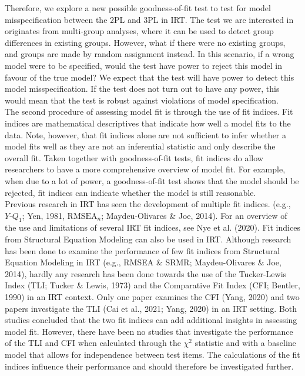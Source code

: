 \documentclass[Royal,sageapa,times,doublespace]{sagej}
\begin{document}
\indent Therefore, we explore a new possible goodness-of-fit test to test for model misspecification between the 2PL and 3PL in IRT. The test we are interested in originates from multi-group analyses, where it can be used to detect group differences in existing groups. However, what if there were no existing groups, and groups are made by random assignment instead. In this scenario, if a wrong model were to be specified, would the test have power to reject this model in favour of the true model? We expect that the test will have power to detect this model misspecification. If the test does not turn out to have any power, this would mean that the test is robust against violations of model specification. \\

\indent The second procedure of assessing model fit is through the use of fit indices. Fit indices are mathematical descriptives that indicate how well a model fits to the data. Note, however, that fit indices alone are not sufficient to infer whether a model fits well as they are not an inferential statistic and only describe the overall fit. Taken together with goodness-of-fit tests, fit indices do allow researchers to have a more comprehensive overview of model fit. For example, when due to a lot of power, a goodness-of-fit test shows that the model should be rejected, fit indices can indicate whether the model is still reasonable. \\ 
\indent Previous research in IRT has seen the development of multiple fit indices. (e.g., $Y\text{-}Q_1$; Yen, 1981, $\text{RMSEA}_n$; Maydeu-Olivares \& Joe, 2014). For an overview of the use and limitations of several IRT fit indices, see Nye et al. (2020). Fit indices from Structural Equation Modeling can also be used in IRT. Although research has been done to examine the performance of few fit indices from Structural Equation Modeling in IRT (e.g., RMSEA \& SRMR; Maydeu-Olivares \& Joe, 2014), hardly any research has been done towards the use of the Tucker-Lewis Index (TLI; Tucker \& Lewis, 1973) and the Comparative Fit Index (CFI; Bentler, 1990) in an IRT context. Only one paper examines the CFI (Yang, 2020) and two papers investigate the TLI (Cai et al., 2021; Yang, 2020) in an IRT setting. Both studies concluded that the two fit indices can add additional insights in assessing model fit. However, there have been no studies that investigate the performance of the TLI and CFI when calculated through the $\chi^2$ statistic and with a baseline model that allows for independence between test items. The calculations of the fit indices influence their performance and should therefore be investigated further. \\
\end{document}
